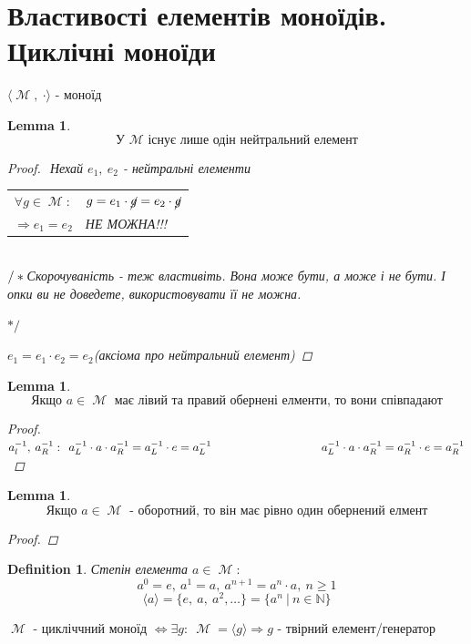 \documentclass[a4paper,12pt, centered]{bookest}
\newtheorem{lemma}[theorem]{Lemma}
\newtheorem{definition}{Definition}[section]
\DeclareMathOperator{\Mm}{\mathcal{M}}
\newcommand\tab[1][1cm]{\hspace*{#1}}
\begin{document}
\section{Властивості елементів моноїдів. Циклічні моноїди}
$\langle \Mm,\>\cdot \rangle$ - моноїд
\begin{lemma}
		$$\textrm{У }\Mm\textrm{ існує лише одін нейтральний елемент}$$
		\begin{proof}$ $
			Нехай $e_1,\>e_2$ - нейтральні елементи
\begin{tabular}{cl}
{\color{red}\rlap{\rule[2.5pt]{6cm}{1pt}}}$\forall g\in \Mm:$ & $g=e_1\cdot  \cancel{g}=e_2\cdot  \cancel{g}$\\
  {\color{red}\rlap{\smash{\makebox[7ex]{\rule[-2pt]{1pt}{35pt}}}}} $\Rightarrow e_1=e_2$ & {\color{red} НЕ МОЖНА!!!}
\end{tabular}\\$\slash*\\$Скорочуваність - теж властивіть. Вона може бути, а може і не бути. І опки ви не доведете, використовувати її не можна.\begin{flushright}
$*\slash$
\end{flushright}
$e_1=e_1\cdot  e_2=e_2$(аксіома про нейтральний елемент)
		\end{proof}
\end{lemma}
\begin{lemma}
	$$\textrm{Якщо }a\in \Mm\textrm{ має лівий та правий обернені елменти, то вони співпадают}$$
	\begin{proof}
		$a_l^{-1},\>a_R^{-1}:\>\>a_L^{-1}\cdot  a\cdot  a_R^{-1}=a_L^{-1}\cdot  e=a_L^{-1}\\\tab\tab\tab\>\>\>\> 
		a_L^{-1}\cdot  a\cdot  a_R^{-1}=a_R^{-1}\cdot  e=a_R^{-1}$
	\end{proof}
\end{lemma}
\begin{lemma}
	$$\textrm{Якщо }a\in \Mm\textrm{ - оборотний, то він має рівно один обернений елмент}$$
	\begin{proof}
		
	\end{proof}
\end{lemma}
\begin{definition}Степін елемента $a\in\Mm:$
	$$a^0=e,\>a^1=a,\>a^{n+1}=a^n\cdot  a,\>n\geq1$$
	$$\langle a\rangle=\{e,\>a,\>a^2,\dots\}=\{a^n\>|\>n\in\mathbb{N}\}$$
\end{definition}
$\Mm$ - цикліччний моноїд $\Leftrightarrow\exists g:\>\Mm=\langle g\rangle\Rightarrow g$ - твірний елемент/генератор
\end{document}

